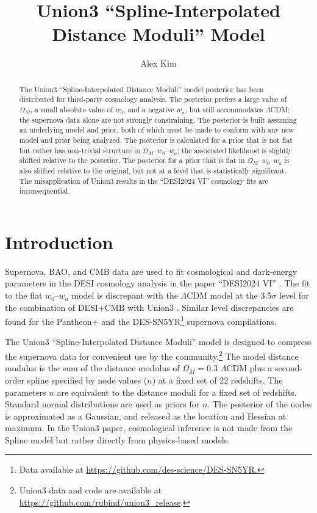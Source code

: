 \documentclass{aastex631}
\begin{document}
\title{Union3 ``Spline-Interpolated Distance Moduli'' Model}
\author[0000-0001-6315-8743]{Alex Kim}

\begin{abstract}
The Union3 ``Spline-Interpolated Distance Moduli'' model posterior has been distributed for third-party cosmology analysis. The posterior prefers a large value of
$\Omega_M$, a small absolute value of $w_0$, and a negative $w_a$, but still accommodates  $\Lambda$CDM; the supernova data alone are not strongly constraining.  The posterior is built assuming an underlying model and prior, both of which must be made to conform with any new model and prior being analyzed.
The posterior is calculated for
a  prior that is not flat but rather has non-trivial structure in $\Omega_M$--$w_0$--$w_a$;
the associated likelihood is slightly shifted relative to the posterior.
The  posterior for a prior that is flat in $\Omega_M$--$w_0$--$w_a$ is also shifted relative to the original, but not
at a level that is  statistically significant.    The misapplication of Union3 results in the  ``DESI2024 VI'' cosmology
fits are inconsequential.
\end{abstract}


\section{Introduction}
Supernova, BAO, and CMB data are used to fit cosmological and dark-energy parameters in the DESI cosmology
analysis in the paper ``DESI2024 VI''  \citep{2024arXiv240403002D}.  The fit to the flat $w_0$--$w_a$ model is discrepant with the $\Lambda$CDM
model at the 3.5$\sigma$ level for the combination of DESI+CMB with Union3  \cite{2023arXiv231112098R}.
Similar level discrepancies are found for the Pantheon+ \cite{2022ApJ...938..113S} and the DES-SN5YR\footnote{Data available at \url{https://github.com/des-science/DES-SN5YR.}} supernova compilations.

The Union3 ``Spline-Interpolated Distance Moduli'' model is designed to compress the  supernova data for convenient use by the community.\footnote{Union3 data and code are available at \url{https://github.com/rubind/union3_release}.}
The  model distance modulus
is the sum of the distance modulus of $\Omega_M=0.3$  $\Lambda$CDM plus a second-order spline specified by node values ($n$)
at a fixed set of 22 redshifts. 
The parameters $n$ are equivalent to the distance moduli for a fixed set of redshifts.
Standard normal distributions are used as priors for $n$.  
The posterior of the nodes is approximated as a Gaussian, and released as the location and Hessian at maximum.
In the Union3 paper, cosmological inference is not made from the Spline model but rather directly from physics-based models.
\end{document}
